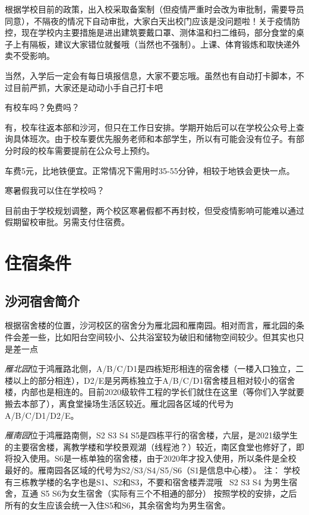 \documentclass[UTF8]{ctexart}
\newcommand{\faq}[1]{{\heiti #1}}
\begin{document}
根据学校目前的政策，出入校采取备案制（但疫情严重时会改为审批制，需要导员同意），不隔夜的情况下自动审批，大家白天出校门应该是没问题啦！关于疫情防控，现在学校内主要措施是进出建筑要戴口罩、测体温和扫二维码，部分食堂的桌子上有隔板，建议大家错位就餐哦（当然也不强制）。上课、体育锻炼和取快递外卖不受影响。

当然，入学后一定会有每日填报信息，大家不要忘哦。虽然也有自动打卡脚本，不过目前严抓，大家还是动动小手自己打卡吧~

\faq{有校车吗？免费吗？}

有，校车往返本部和沙河，但只在工作日安排。学期开始后可以在学校公众号上查询具体班次。由于校车要优先服务老师和本部学生，所以有可能会没有位子。有部分时段的校车需要提前在公众号上预约。

车费5元，比地铁便宜。正常情况下需用时35-55分钟，相较于地铁会更快一点。

\faq{寒暑假我可以住在学校吗？}

目前由于学校规划调整，两个校区寒暑假都不再封校，但受疫情影响可能难以通过假期留校审批。另需支付住宿费。

\section{住宿条件}

\subsection*{沙河宿舍简介}

根据宿舍楼的位置，沙河校区的宿舍分为雁北园和雁南园。相对而言，雁北园的条件会差一些，比如阳台空间较小、公共浴室较为破旧和储物空间较少。但其实也只是差一点~

\emph{雁北园}位于鸿雁路北侧，A/B/C/D1是四栋矩形相连的宿舍楼（一楼入口独立，二楼以上的部分相连），D2/E是另两栋独立于A/B/C/D1宿舍楼且相对较小的宿舍楼，内部也是相连的。目前2020级软件工程的学长们就住在这里（等你们入学就要搬去本部了），离食堂操场生活区较近。雁北园各区域的代号为A/B/C/D1/D2/E。

\emph{雁南园}位于鸿雁路南侧，S2 S3 S4 S5是四栋平行的宿舍楼，六层，是2021级学生的主要宿舍楼，离教学楼和学校景观湖（线程池？）较近，南区食堂也修好了，即将投入使用。S6是一栋单独的宿舍楼，由于2020年才投入使用，所以条件是全校最好的。雁南园各区域的代号为S2/S3/S4/S5/S6（S1是信息中心楼）。
注：
学校有三栋教学楼的名字也是S1、S2和S3，不要和宿舍楼弄混哦~
S2 S3 S4 为男生宿舍，互通
S5 S6为女生宿舍（实际有三个不相通的部分）
按照学校的安排，之后所有的女生应该会统一入住S5和S6，其余宿舍均为男生宿舍。
\end{document}
